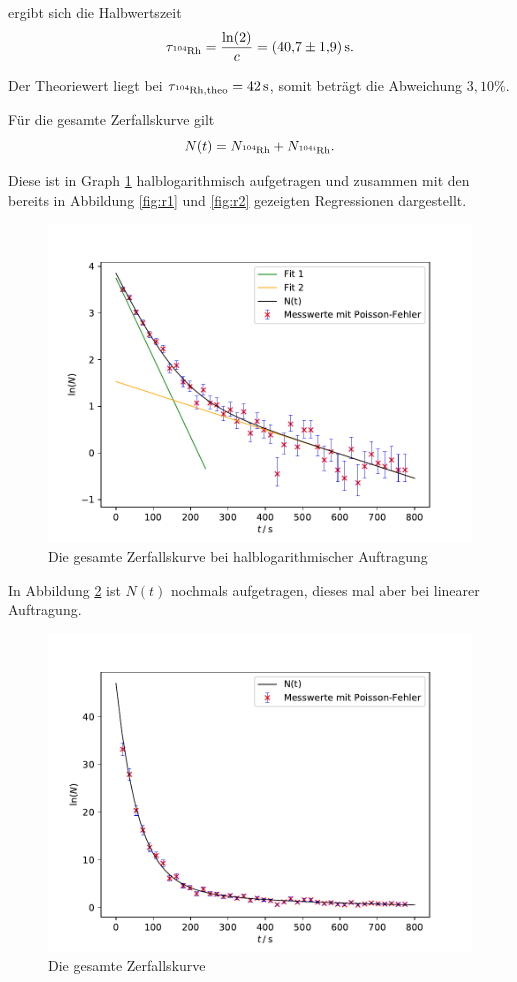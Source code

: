 ergibt sich die Halbwertszeit
\begin{equation*}
  \tau_{\ce{^{104}Rh}} = \frac{\ln(2)}{c} = \SI{40,7(19)}{\s}.
\end{equation*}

Der Theoriewert \cite{sample3} liegt bei $\tau_{\ce{^{104}Rh}, \text{theo}} = \SI{42}{\s}$, somit beträgt die Abweichung $3,10 \%$.

Für die gesamte Zerfallskurve gilt
\begin{equation*}
  N(t) = N_{\ce{^{104}Rh}} + N_{\ce{^{104i}Rh}}.
\end{equation*}

Diese ist in Graph \ref{fig:r3} halblogarithmisch aufgetragen und zusammen mit den bereits in Abbildung \ref{fig:r1} und \ref{fig:r2}
gezeigten Regressionen dargestellt.
\begin{figure}[H]
  \centering
  \includegraphics[width=\textwidth]{Plots/rhodges.pdf}
  \caption{Die gesamte Zerfallskurve bei halblogarithmischer Auftragung}
  \label{fig:r3}
\end{figure}

In Abbildung \ref{fig:r4} ist $N(t)$ nochmals aufgetragen, dieses mal aber bei linearer Auftragung.
\begin{figure}[H]
  \centering
  \includegraphics[width=\textwidth]{Plots/rhodgesnolog.pdf}
  \caption{Die gesamte Zerfallskurve}
  \label{fig:r4}
\end{figure}
